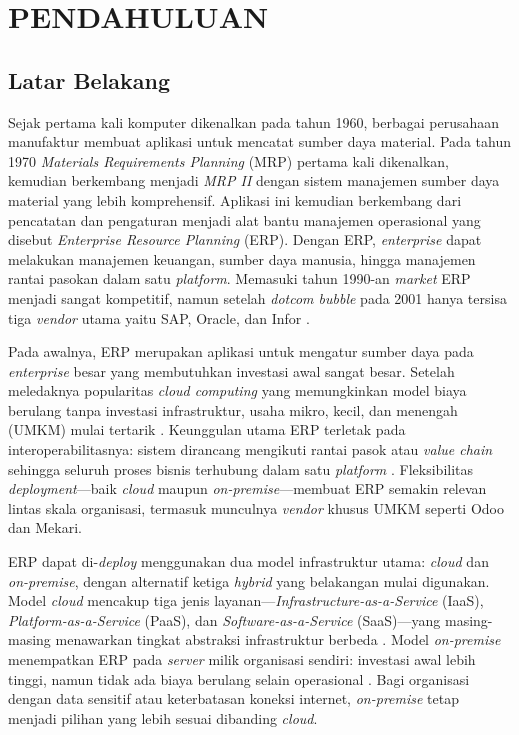 \chapter{PENDAHULUAN}
\label{chap:pendahuluan}
\section{Latar Belakang}
Sejak pertama kali komputer dikenalkan pada tahun 1960, berbagai perusahaan manufaktur membuat aplikasi untuk mencatat sumber daya material. Pada tahun 1970 \textit{Materials Requirements Planning} (MRP) pertama kali dikenalkan, kemudian berkembang menjadi \textit{MRP II} dengan sistem manajemen sumber daya material yang lebih komprehensif. Aplikasi ini kemudian berkembang dari pencatatan dan pengaturan menjadi alat bantu manajemen operasional yang disebut \textit{Enterprise Resource Planning} (ERP). Dengan ERP, \textit{enterprise} dapat melakukan manajemen keuangan, sumber daya manusia, hingga manajemen rantai pasokan dalam satu \textit{platform}. Memasuki tahun 1990-an \textit{market} ERP menjadi sangat kompetitif, namun setelah \textit{dotcom bubble} pada 2001 hanya tersisa tiga \textit{vendor} utama yaitu SAP, Oracle, dan Infor \cite{goldston2020evolution}.

Pada awalnya, ERP merupakan aplikasi untuk mengatur sumber daya pada \textit{enterprise} besar yang membutuhkan investasi awal sangat besar. Setelah meledaknya popularitas \textit{cloud computing} yang memungkinkan model biaya berulang tanpa investasi infrastruktur, usaha mikro, kecil, dan menengah (UMKM) mulai tertarik \cite{goldston2020evolution}. Keunggulan utama ERP terletak pada interoperabilitasnya: sistem dirancang mengikuti rantai pasok atau \textit{value chain} sehingga seluruh proses bisnis terhubung dalam satu \textit{platform} \cite{boza2015}. Fleksibilitas \textit{deployment}—baik \textit{cloud} maupun \textit{on-premise}—membuat ERP semakin relevan lintas skala organisasi, termasuk munculnya \textit{vendor} khusus UMKM seperti Odoo dan Mekari.

ERP dapat di-\textit{deploy} menggunakan dua model infrastruktur utama: \textit{cloud} dan \textit{on-premise}, dengan alternatif ketiga \textit{hybrid} yang belakangan mulai digunakan. Model \textit{cloud} mencakup tiga jenis layanan—\textit{Infrastructure-as-a-Service} (IaaS), \textit{Platform-as-a-Service} (PaaS), dan \textit{Software-as-a-Service} (SaaS)—yang masing-masing menawarkan tingkat abstraksi infrastruktur berbeda \cite{odunayo2018cloud}. Model \textit{on-premise} menempatkan ERP pada \textit{server} milik organisasi sendiri: investasi awal lebih tinggi, namun tidak ada biaya berulang selain operasional \cite{Younus2024}. Bagi organisasi dengan data sensitif atau keterbatasan koneksi internet, \textit{on-premise} tetap menjadi pilihan yang lebih sesuai dibanding \textit{cloud}.

